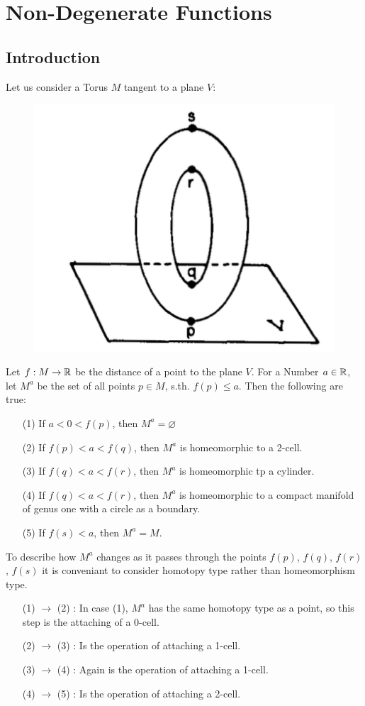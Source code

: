 \documentclass[a4paper,11pt]{article}
\begin{document}
\section{Non-Degenerate Functions}

\subsection{Introduction}

Let us consider a Torus $M$ tangent to a plane $V$:
\begin{figure}[H]
    \centering
    \includegraphics[width=0.4\linewidth]{resources/Diagram1.png}
    \label{fig:diagram1}
\end{figure}
Let $f: M \rightarrow {\mathbb R}$ be the distance of a point to the plane $V$. 
For a Number $a \in {\mathbb R} $, let $M^a$ be the set of all points $p \in M$, s.th. 
$f(p) \leq a$.
Then the following are true:
\begin{enumerate}
   \item[(1)] If $a < 0 < f(p)$, then $M^a = \varnothing$
   \item[(2)] If $f(p) < a < f(q)$, then $M^a$ is homeomorphic to a 2-cell.
   \item[(3)] If $f(q) < a < f(r)$, then $M^a$ is homeomorphic tp a cylinder.
   \item[(4)] If $f(q) < a < f(r)$, then $M^a$ is homeomorphic to a compact 
   manifold of genus one with a circle as a boundary.
   \item[(5)] If $f(s) < a$, then $M^a = M$.
\end{enumerate}

To describe how $M^a$ changes as it passes through the points $f(p)$, $f(q)$, 
$f(r)$, $f(s)$ it is conveniant to consider
homotopy type rather than homeomorphism type. 
\begin{enumerate}[leftmargin=2cm]
   \item[(1) $\rightarrow$ (2)]: In case (1), $M^a$ has the same homotopy type 
   as a point, so this step is the attaching of a 0-cell. 
   \item[(2) $\rightarrow$ (3)]: Is the operation of attaching a 1-cell. 
   \item[(3) $\rightarrow$ (4)]: Again is the operation of attaching a 1-cell. 
   \item[(4) $\rightarrow$ (5)]: Is the operation of attaching a 2-cell. 
\end{enumerate}
\end{document}
